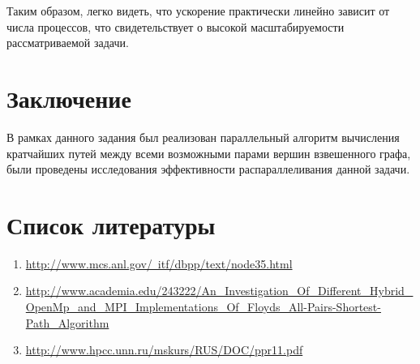 \documentclass[a4paper,12pt]{report}
\begin{document}
	\par Таким образом, легко видеть, что ускорение практически линейно зависит от числа процессов, что свидетельствует о  высокой масштабируемости рассматриваемой задачи.

\section*{Заключение}
	\par В рамках данного задания был реализован параллельный алгоритм вычисления кратчайших путей между всеми возможными парами вершин взвешенного графа, были проведены исследования эффективности распараллеливания данной задачи.
	
\section*{Список литературы}
\begin{enumerate}
\item
\href{http://www.mcs.anl.gov/~itf/dbpp/text/node35.html}{http://www.mcs.anl.gov/~itf/dbpp/text/node35.html}\\
\item
\href{http://www.academia.edu/243222/An\_Investigation\_Of\_Different\_Hybrid\_OpenMp\_and\_MPI\_Implementations\_Of\_Floyds\_All-Pairs-Shortest-Path\_Algorithm}{http://www.academia.edu/243222/An\_Investigation\_Of\_Different\_Hybrid\_OpenMp\_and\_MPI\_Implementations\_Of\_Floyds\_All-Pairs-Shortest-Path\_Algorithm}\\
\item
\href{http://www.hpcc.unn.ru/mskurs/RUS/DOC/ppr11.pdf}{http://www.hpcc.unn.ru/mskurs/RUS/DOC/ppr11.pdf}\\
\end{enumerate}
\end{document}
